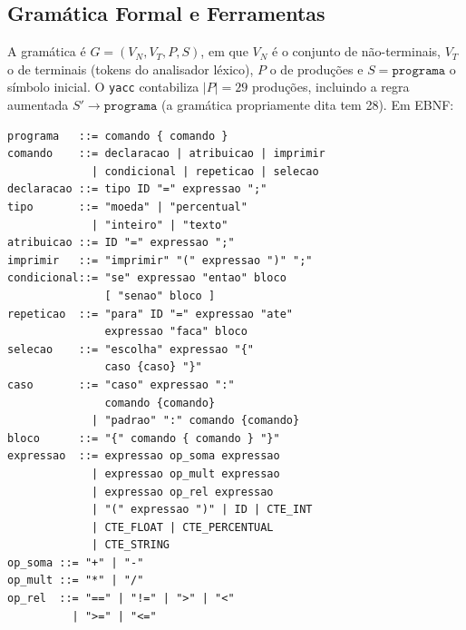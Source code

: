 \documentclass[conference]{IEEEtran}
\begin{document}
\subsection{Gramática Formal e Ferramentas}
\label{sec:gramatica}

A gramática é $G = (V_N, V_T, P, S)$, em que $V_N$ é o conjunto de não-terminais, $V_T$ o de terminais (tokens do analisador léxico), $P$ o de produções e $S = \texttt{programa}$ o símbolo inicial. O \texttt{yacc} contabiliza $|P| = 29$ produções, incluindo a regra aumentada $S' \rightarrow \texttt{programa}$ (a gramática propriamente dita tem 28). Em EBNF:

\begin{minipage}{\columnwidth}\begin{lstlisting}[basicstyle=\ttfamily\fontsize{6.2}{7.2}\selectfont]
programa   ::= comando { comando }
comando    ::= declaracao | atribuicao | imprimir
             | condicional | repeticao | selecao
declaracao ::= tipo ID "=" expressao ";"
tipo       ::= "moeda" | "percentual"
             | "inteiro" | "texto"
atribuicao ::= ID "=" expressao ";"
imprimir   ::= "imprimir" "(" expressao ")" ";"
condicional::= "se" expressao "entao" bloco
               [ "senao" bloco ]
repeticao  ::= "para" ID "=" expressao "ate"
               expressao "faca" bloco
selecao    ::= "escolha" expressao "{"
               caso {caso} "}"
caso       ::= "caso" expressao ":"
               comando {comando}
             | "padrao" ":" comando {comando}
bloco      ::= "{" comando { comando } "}"
expressao  ::= expressao op_soma expressao
             | expressao op_mult expressao
             | expressao op_rel expressao
             | "(" expressao ")" | ID | CTE_INT
             | CTE_FLOAT | CTE_PERCENTUAL
             | CTE_STRING
op_soma ::= "+" | "-"
op_mult ::= "*" | "/"
op_rel  ::= "==" | "!=" | ">" | "<"
          | ">=" | "<="
\end{lstlisting}\end{minipage}\par\smallskip
\end{document}
